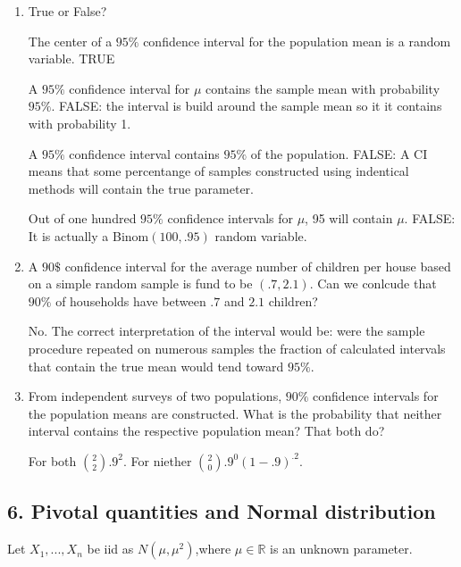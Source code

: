 \documentclass{tufte-book}
\begin{document}
\begin{enumerate}

\item True or False?

The center of a $95\%$ confidence interval for the population mean is a random variable. TRUE

A $95\%$ confidence interval for $\mu$ contains the sample mean with probability $95\%$.  FALSE: the interval is build around the sample mean so it it contains with probability 1.

A $95\%$ confidence interval contains $95\%$ of the population. FALSE: A CI means that some percentange of samples constructed using indentical methods will contain the true parameter.

Out of one hundred $95\%$ confidence intervals for $\mu$, 95 will contain $\mu$. FALSE: It is actually a Binom$(100, .95)$ random variable.

\item A $90\$$ confidence interval for the average number of children per house based on a simple random sample is fund to be $(.7, 2.1)$.  Can we conlcude that $90\%$ of households have between $.7$ and $2.1$ children?

No. The correct interpretation of the interval would be: were the sample procedure repeated on numerous samples the fraction of calculated intervals that contain the true mean would tend toward $95\%$.


\item From independent surveys of two populations, $90\%$ confidence intervals for the population means are constructed.  What is the probability that neither interval contains the respective population mean?  That both do?

For both $\binom{2}{2}.9^2$.  For niether $\binom{2}{0}.9^0(1-.9)^{.2}$.

\end{enumerate}

\subsection{6. Pivotal quantities and Normal distribution}
Let $X_1, ...,X_n$ be iid as $N(\mu, \mu^2)$,where $\mu \in \mathbb{R}$ is an unknown parameter.
\end{document}
